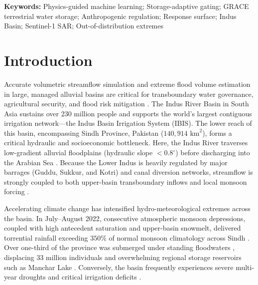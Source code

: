\documentclass[11pt,a4paper,fleqn]{article}
\begin{document}
\begin{singlespace}
\noindent \textbf{Keywords:} Physics-guided machine learning; Storage-adaptive gating; GRACE terrestrial water storage; Anthropogenic regulation; Response surface; Indus Basin; Sentinel-1 SAR; Out-of-distribution extremes\\[1.5em]

\end{singlespace}

\newpage


\section{Introduction}

Accurate volumetric streamflow simulation and extreme flood volume estimation in large, managed alluvial basins are critical for transboundary water governance, agricultural security, and flood risk mitigation \citep{adams2024flood, immerzeel2020importance, razavi2022future, young2019pakistan}. The Indus River Basin in South Asia sustains over 230 million people and supports the world's largest contiguous irrigation network---the Indus Basin Irrigation System (IBIS). The lower reach of this basin, encompassing Sindh Province, Pakistan ($140,914\text{ km}^2$), forms a critical hydraulic and socioeconomic bottleneck. Here, the Indus River traverses low-gradient alluvial floodplains (hydraulic slope $<0.8^\circ$) before discharging into the Arabian Sea \citep{hashmi2022hydrodynamic, inam2007geographic}. Because the Lower Indus is heavily regulated by major barrages (Guddu, Sukkur, and Kotri) and canal diversion networks, streamflow is strongly coupled to both upper-basin transboundary inflows and local monsoon forcing \citep{biemans2016future, hossain2025satellite, rodell2018emerging}.

Accelerating climate change has intensified hydro-meteorological extremes across the basin. In July--August 2022, consecutive atmospheric monsoon depressions, coupled with high antecedent saturation and upper-basin snowmelt, delivered torrential rainfall exceeding $350\%$ of normal monsoon climatology across Sindh \citep{nanditha20232022, syed2022analysis, wwa2022pakistan}. Over one-third of the province was submerged under standing floodwaters \citep{tian2023satellite}, displacing 33 million individuals and overwhelming regional storage reservoirs such as Manchar Lake \citep{najibi2018recent, tariq2026retrospective}. Conversely, the basin frequently experiences severe multi-year droughts and critical irrigation deficits \citep{biemans2016future}.
\end{document}
